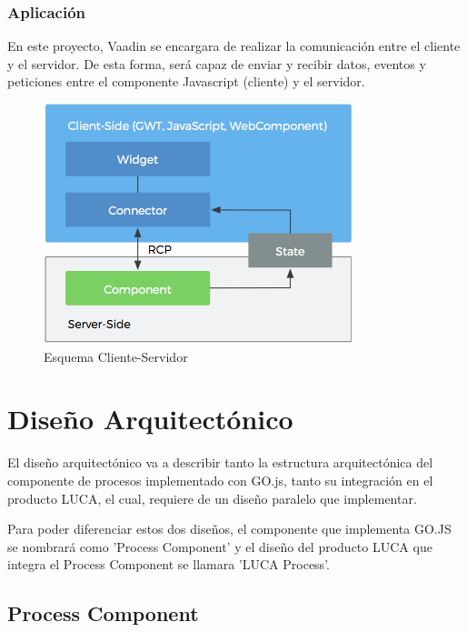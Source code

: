\documentclass[a4paper,12pt]{article}
\begin{document}
 			\subsubsection{Aplicación}
 				En este proyecto, Vaadin se encargara de realizar la comunicación entre el cliente y el servidor. De esta forma, será capaz de enviar y recibir datos, eventos y peticiones entre el componente Javascript (cliente) y el servidor.
 			
 			
	 			\begin{figure}[h]
	 				\centering
	 				\includegraphics[scale=1.5]{schema.png}
	 				\caption{Esquema Cliente-Servidor}\label{fig:schema}
	 			\end{figure}
 			
 		
	
	\afterpage{\null\newpage}
	\newpage
	
	\section{Diseño Arquitectónico}
	
	El diseño arquitectónico va a describir tanto la estructura arquitectónica del componente de procesos implementado con GO.js, tanto su integración en el producto LUCA, el cual, requiere de un diseño paralelo que implementar.
	
	\vspace{5mm}
	
	Para poder diferenciar estos dos diseños, el componente que implementa GO.JS se nombrará como 'Process Component' y el diseño del producto LUCA que integra el Process Component se llamara 'LUCA Process'.
	
		\subsection{Process Component}
		
\end{document}
